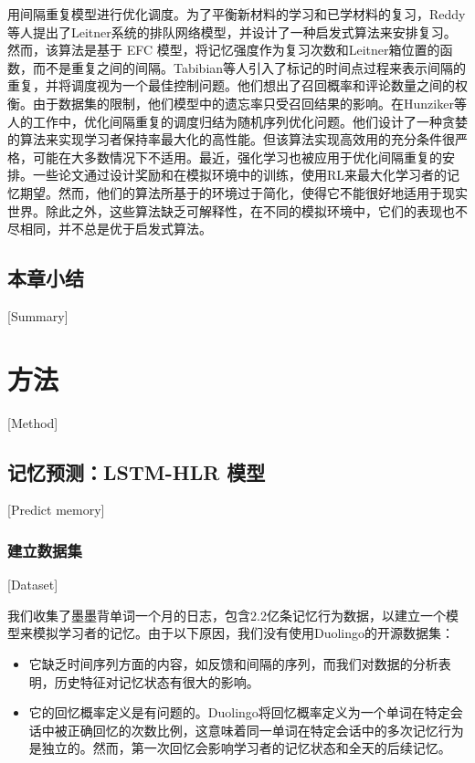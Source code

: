 用间隔重复模型进行优化调度。为了平衡新材料的学习和已学材料的复习，Reddy等人\cite{reddyUnboundedHumanLearning2016}提出了Leitner系统\cite{leitnerLerntManLeben1974}的排队网络模型，并设计了一种启发式算法来安排复习。然而，该算法是基于 EFC 模型\cite{reddyUnboundedHumanLearning2016}，将记忆强度作为复习次数和Leitner箱位置的函数，而不是重复之间的间隔。Tabibian等人\cite{tabibianEnhancingHumanLearning2019}引入了标记的时间点过程来表示间隔的重复，并将调度视为一个最佳控制问题。他们想出了召回概率和评论数量之间的权衡。由于数据集的限制，他们模型中的遗忘率只受召回结果的影响。在Hunziker等人\cite{hunzikerTeachingMultipleConcepts2019}的工作中，优化间隔重复的调度归结为随机序列优化问题。他们设计了一种贪婪的算法来实现学习者保持率最大化的高性能。但该算法实现高效用的充分条件很严格，可能在大多数情况下不适用。最近，强化学习也被应用于优化间隔重复的安排。一些论文\cite{reddyAcceleratingHumanLearning2017,upadhyayDeepReinforcementLearning2018,sinhaUsingDeepReinforcement2019,yangTADSLearningTimeaware2020}通过设计奖励和在模拟环境中的训练，使用RL来最大化学习者的记忆期望。然而，他们的算法所基于的环境过于简化，使得它不能很好地适用于现实世界。除此之外，这些算法缺乏可解释性，在不同的模拟环境中，它们的表现也不尽相同，并不总是优于启发式算法。

\section{本章小结}[Summary]

\chapter{方法}[Method]

\section{记忆预测：LSTM-HLR 模型}[Predict memory]

\subsection{建立数据集}[Dataset]

我们收集了墨墨背单词一个月的日志，包含2.2亿条记忆行为数据，以建立一个模型来模拟学习者的记忆。由于以下原因，我们没有使用Duolingo的开源数据集：

\begin{itemize}
    \item 它缺乏时间序列方面的内容，如反馈和间隔的序列，而我们对数据的分析表明，历史特征对记忆状态有很大的影响。
    \item 它的回忆概率定义是有问题的。Duolingo将回忆概率定义为一个单词在特定会话中被正确回忆的次数比例，这意味着同一单词在特定会话中的多次记忆行为是独立的。然而，第一次回忆会影响学习者的记忆状态和全天的后续记忆。
\end{itemize}

